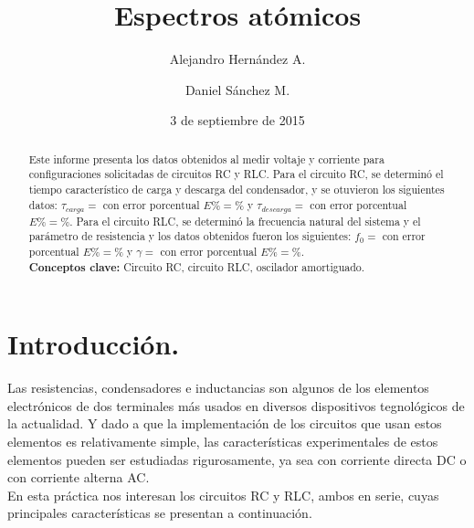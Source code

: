 \documentclass[prb,aps,twocolumn,preprintnumbers,amsmath,amssymb]{revtex4}
\begin{document}
\title{Espectros atómicos}%

\author{Alejandro Hernández A.}%
\author{Daniel Sánchez M.}%
%


\date{3 de septiembre de 2015}%

\begin{abstract}
Este informe presenta los datos obtenidos al medir voltaje y corriente para configuraciones solicitadas de circuitos RC y RLC. Para el circuito RC, se determinó el tiempo característico de carga y descarga del condensador, y se otuvieron los siguientes datos: $\tau_{carga} = $ con error porcentual $E\% = \%$ y $\tau_{descarga} = $ con error porcentual $E\% = \%$. Para el circuito RLC, se determinó la frecuencia natural del sistema y el parámetro de resistencia y los datos obtenidos fueron los siguientes: $f_{0} = $ con error porcentual $E\% = \%$ y $\gamma = $ con error porcentual $E\% = \%$. 
\\

\noindent \textbf{Conceptos clave:} Circuito RC, circuito RLC, oscilador amortiguado.
\end{abstract}
                             
\maketitle

\section{\label{sec:level1}Introducción.}

Las resistencias, condensadores e inductancias son algunos de los elementos electrónicos de dos terminales más usados en diversos dispositivos tegnológicos de la actualidad. Y dado a que la implementación de los circuitos que usan estos elementos es relativamente simple, las características experimentales de estos elementos pueden ser estudiadas rigurosamente, ya sea con corriente directa DC o con corriente alterna AC.\\

En esta práctica nos interesan los circuitos RC y RLC, ambos en serie, cuyas principales características se presentan a continuación.
\end{document}
